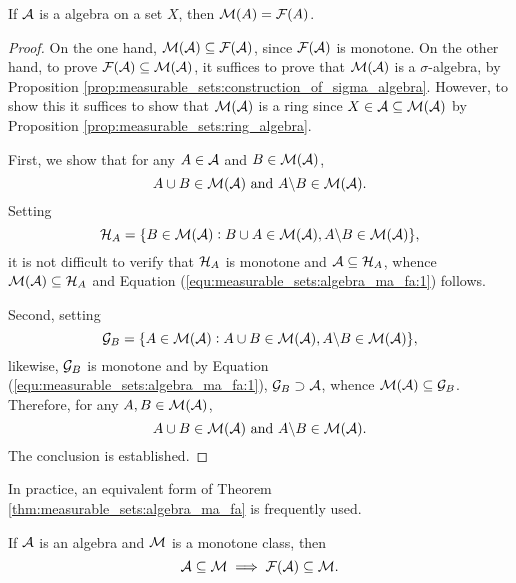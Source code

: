 \begin{thm}
\label{thm:measurable_sets:algebra_ma_fa}
If $\mathcal{A}$ is a algebra on a set $X$, then $\mathcal{M}(A) = \mathcal{F}(A)$. 
\end{thm}
\begin{proof}
On the one hand, $\mathcal{M}(\mathcal{A}) \subseteq \mathcal{F}(\mathcal{A})$, since $\mathcal{F}(\mathcal{A})$ is monotone. 
On the other hand, to prove $\mathcal{F}(\mathcal{A}) \subseteq \mathcal{M}(\mathcal{A})$, it suffices to 
prove that $\mathcal{M}(\mathcal{A})$ is a $\sigma$-algebra, by Proposition 
\ref{prop:measurable_sets:construction_of_sigma_algebra}. 
However, to show this it suffices to show that $\mathcal{M}(\mathcal{A})$ is a ring since 
$X \in \mathcal{A} \subseteq \mathcal{M}(\mathcal{A})$ by Proposition 
\ref{prop:measurable_sets:ring_algebra}. 

First, we show that for any $A \in \mathcal{A}$ and $B \in \mathcal{M}(\mathcal{A})$, 
\begin{equation}
    \label{equ:measurable_sets:algebra_ma_fa:1}
    A \cup B \in \mathcal{M}(\mathcal{A}) \text{ and } A \backslash B \in \mathcal{M}(\mathcal{A}). 
\end{equation}
Setting 
\begin{equation*}
    \mathcal{H}_A = \{B \in \mathcal{M}(\mathcal{A}): B \cup A \in \mathcal{M}(\mathcal{A}), 
    A \backslash B \in \mathcal{M}(\mathcal{A})\}, 
\end{equation*}
it is not difficult to verify that $\mathcal{H}_A$ is monotone and $\mathcal{A} \subseteq 
\mathcal{H}_A$, whence $\mathcal{M}(\mathcal{A}) \subseteq \mathcal{H}_A$ and Equation 
(\ref{equ:measurable_sets:algebra_ma_fa:1}) follows. 

Second, setting 
\begin{equation*}
    \mathcal{G}_B = \{A \in \mathcal{M}(\mathcal{A}): A \cup B \in \mathcal{M}(\mathcal{A}), 
    A \backslash B \in \mathcal{M}(\mathcal{A})\}, 
\end{equation*}
likewise, $\mathcal{G}_B$ is monotone and by Equation 
(\ref{equ:measurable_sets:algebra_ma_fa:1}), $\mathcal{G}_B \supset \mathcal{A}$, 
whence $\mathcal{M}(\mathcal{A}) \subseteq \mathcal{G}_B$. 
Therefore, for any $A, B \in \mathcal{M}(\mathcal{A})$, 
\begin{equation*}
    A \cup B \in \mathcal{M}(\mathcal{A}) \text{ and } A \backslash B \in \mathcal{M}(\mathcal{A}). 
\end{equation*}
The conclusion is established. 
\end{proof}

In practice, an equivalent form of Theorem 
\ref{thm:measurable_sets:algebra_ma_fa} is frequently used. 
\begin{cor}
If $\mathcal{A}$ is an algebra and $\mathcal{M}$ is a monotone class, then 
\begin{equation*}
    \mathcal{A} \subseteq \mathcal{M} \implies \mathcal{F}(\mathcal{A}) \subseteq \mathcal{M}. 
\end{equation*}
\end{cor}

